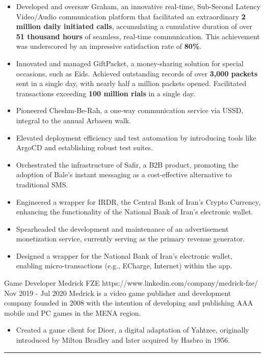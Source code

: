\documentclass[a4paper,20pt]{article}
\begin{document}
\begin{minipage}[t]{0.65\textwidth}
{    \begin{itemize}[leftmargin=.5cm]
      \item \justifying\small Developed and oversaw Graham, an innovative real-time, Sub-Second Latency Video/Audio communication platform that facilitated an extraordinary \textbf{2 million daily initiated calls}, accumulating a cumulative duration of over \textbf{51 thousand hours} of seamless, real-time communication. This achievement was underscored by an impressive satisfaction rate of \textbf{80\%}.
      \item \justifying\small Innovated and managed GiftPacket, a money-sharing solution for special occasions, such as Eids. Achieved outstanding records of over \textbf{3,000 packets} sent in a single day, with nearly half a million packets opened. Facilitated transactions exceeding \textbf{100 million rials} in a single day.
      \item \justifying\small Pioneered Cheshm-Be-Rah, a one-way communication service via USSD, integral to the annual Arbaeen walk.
      \item \justifying\small Elevated deployment efficiency and test automation by introducing tools like ArgoCD and establishing robust test suites.
      \item \justifying\small Orchestrated the infrastructure of Safir, a B2B product, promoting the adoption of Bale's instant messaging as a cost-effective alternative to traditional SMS.
      \item \justifying\small Engineered a wrapper for IRDR, the Central Bank of Iran's Crypto Currency, enhancing the functionality of the National Bank of Iran's electronic wallet.
      \item \justifying\small Spearheaded the development and maintenance of an advertisement monetization service, currently serving as the primary revenue generator.
      \item \justifying\small Designed a wrapper for the National Bank of Iran's electronic wallet, enabling micro-transactions (e.g., ECharge, Internet) within the app.
  \end{itemize}

  \expheadingwithlink
    {Game Developer}
    {Medrick FZE}
    {https://www.linkedin.com/company/medrick-fze/}
    {Nov 2019 - Jul 2020}
    {Medrick is a video game publisher and development company founded in 2008 with the intention of developing and publishing AAA mobile and PC games in the MENA region.}

    \begin{itemize}[leftmargin=.5cm]
      \item \justifying\small Created a game client for Dicer, a digital adaptation of Yahtzee, originally introduced by Milton Bradley and later acquired by Hasbro in 1956.
    \end{itemize}
  }
\end{minipage}

\vspace{-1pt}
\rule{\textwidth}{1pt}
\end{document}
